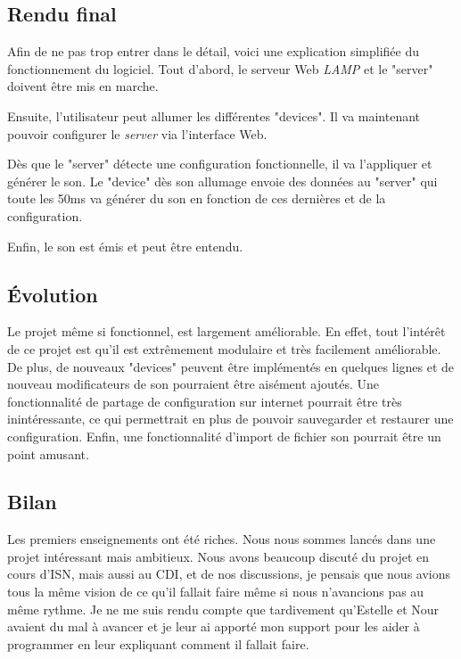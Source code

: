 \documentclass[12pt]{article}
\begin{document}
	\subsection{Rendu final}
	Afin de ne pas trop entrer dans le détail, voici une explication simplifiée du fonctionnement du logiciel. Tout d'abord,  le serveur Web \textit{LAMP} et le "server" doivent être mis en marche. 
	
	Ensuite, l'utilisateur peut allumer les différentes "devices". Il va maintenant pouvoir configurer le \textit{server} via l'interface Web.
	
	Dès que le "server" détecte une configuration fonctionnelle, il va l'appliquer et générer le son. Le "device" dès son allumage envoie des données au "server" qui toute les 50ms va générer du son en fonction de ces dernières et de la configuration.
	
	Enfin, le son est émis et peut être entendu.
	\subsection{Évolution}
	Le projet même si fonctionnel, est largement améliorable. En effet, tout l'intérêt de ce projet est qu'il est extrêmement modulaire et très facilement améliorable. De plus, de nouveaux "devices" peuvent être implémentés en quelques lignes et de nouveau modificateurs de son pourraient être aisément ajoutés. Une fonctionnalité de partage de configuration sur internet pourrait être très inintéressante, ce qui permettrait en plus de pouvoir sauvegarder et restaurer une configuration. Enfin, une fonctionnalité d'import de fichier son pourrait être un point amusant.
	
	\subsection{Bilan}
	Les premiers enseignements ont été riches. Nous nous sommes lancés dans une projet intéressant mais ambitieux. Nous avons beaucoup discuté du projet en cours d'ISN, mais aussi au CDI, et de nos discussions, je pensais que nous avions tous la même vision de ce qu'il fallait faire même si nous n'avancions pas au même rythme. Je ne me suis rendu compte que tardivement qu'Estelle et Nour avaient du mal à avancer et je leur ai apporté mon support pour les aider à programmer en leur expliquant comment il fallait faire.
	
\end{document}

